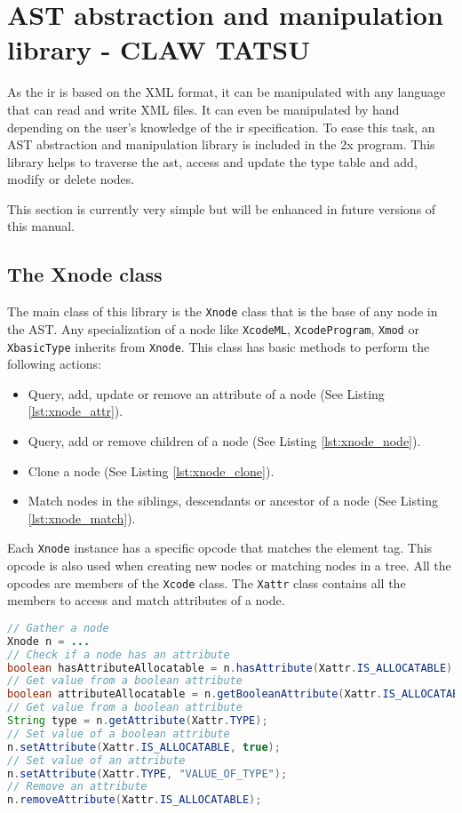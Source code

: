 \chapter{\xcodeml AST abstraction and manipulation library - CLAW TATSU}
\label{chapter:astmanip}
As the \xcodeml \gls{ir} is based on the XML format, it can be manipulated with
any language that can read and write XML files. It can even be manipulated by
hand depending on the user's knowledge of the \xcodeml \gls{ir} specification.
To ease this task, an AST abstraction and manipulation library is included 
in the \cx2x program. This library helps to traverse the \gls{ast}, access and
update the type table and add, modify or delete nodes.

This section is currently very simple but will be enhanced in future versions
of this manual.

\section{The Xnode class}
The main class of this library is the \lstinline|Xnode| class that is the base
of any node in the AST. 
Any specialization of a node like \lstinline|XcodeML|, 
\lstinline|XcodeProgram|, \lstinline|Xmod| or \lstinline|XbasicType| inherits 
from \lstinline|Xnode|.
This class has basic methods to perform the following actions:
\begin{itemize}
\item Query, add, update or remove an attribute of a node 
      (See Listing \ref{lst:xnode_attr}).
\item Query, add or remove children of a node (See Listing \ref{lst:xnode_node}).
\item Clone a node (See Listing \ref{lst:xnode_clone}).
\item Match nodes in the siblings, descendants or ancestor of a node 
      (See Listing \ref{lst:xnode_match}).
\end{itemize}

Each \lstinline|Xnode| instance has a specific opcode that matches the \xcodemlf 
element tag.
This opcode is also used when creating new nodes or matching nodes in a tree.
All the opcodes are members of the \lstinline|Xcode| class.
The \lstinline|Xattr| class contains all the members to access and match 
attributes of a node. 

\begin{lstlisting}[label=lst:xnode_attr, language=Java, 
  caption=Xnode attribute methods]
// Gather a node
Xnode n = ...
// Check if a node has an attribute
boolean hasAttributeAllocatable = n.hasAttribute(Xattr.IS_ALLOCATABLE);
// Get value from a boolean attribute
boolean attributeAllocatable = n.getBooleanAttribute(Xattr.IS_ALLOCATABLE);
// Get value from a boolean attribute
String type = n.getAttribute(Xattr.TYPE);
// Set value of a boolean attribute
n.setAttribute(Xattr.IS_ALLOCATABLE, true);
// Set value of an attribute
n.setAttribute(Xattr.TYPE, "VALUE_OF_TYPE");
// Remove an attribute
n.removeAttribute(Xattr.IS_ALLOCATABLE);
\end{lstlisting}

